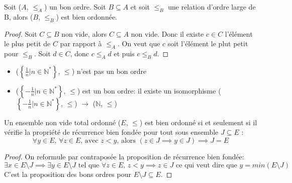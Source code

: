 \begin{prop}
	Soit ($A$, $\leqslant_A$) un bon ordre. Soit $B \subseteq A$ et soit $\leqslant_B$ une relation d'ordre large de B, alors ($B$, $\leqslant_B$) est bien ordonnée.
\end{prop}

\begin{proof}

	Soit $C \subseteq B$ non vide, alors $C \subseteq A$ non vide. Donc il existe $c \in C$ l'élément le plus petit de $C$ par rapport à $\leqslant_A$. On
	veut que $c$ soit l'élément le plut petit pour $\leqslant_B$. Soit $d \in C$, donc $c \leqslant_A d$ et puis $c \leqslant_B d$.

\end{proof}

\begin{example}
	\begin{itemize}
		\item ($\left\{\frac{1}{n} | n \in \mathbb{N}^*\right\}$, $\leqslant$) n'est pas un bon ordre
		\item ($\left\{-\frac{1}{n} | n \in \mathbb{N}^*\right\}$, $\leqslant$) est un bon ordre: il existe un isomorphisme ($\left\{-\frac{1}{n} | n \in \mathbb{N}^*\right\}$, $\leqslant$) $\to$ ($\mathbb{N}$, $\leqslant$)
	\end{itemize}
\end{example}

\begin{prop}

	Un ensemble non vide total ordonné ($E$, $\leqslant$) est bien ordonné si et seulement si il vérifie la propriété de récurrence bien fondée pour tout sous ensemble $J \subseteq E$ :
	\begin{equation*}
		\forall y \in E \text{, } \forall z \in E \text{, avec } z < y \text{, alors } (z \in J \implies y \in J) \implies J = E
	\end{equation*}
	\noindent

\end{prop}

\begin{proof}

	On reformule par contraposée la proposition de récurrence bien fondée:
	\begin{equation*}
		\exists x \in E\setminus J \implies \exists y \in E\setminus J \text{ tel que } \forall z \in E \text{, } z < y \implies z \in J \text{ ce qui veut dire que } y = min(E\setminus J)
	\end{equation*}
	\noindent
	C'est la proposition des bons ordres pour $E\setminus J \subseteq E$.

\end{proof}

